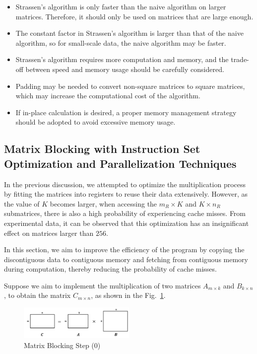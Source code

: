\documentclass[conference]{IEEEtran}
\begin{document}
	\begin{itemize}
\item Strassen's algorithm is only faster than the naive algorithm on larger matrices. Therefore, it should only be used on matrices that are large enough.

\item The constant factor in Strassen's algorithm is larger than that of the naive algorithm, so for small-scale data, the naive algorithm may be faster.

\item Strassen's algorithm requires more computation and memory, and the trade-off between speed and memory usage should be carefully considered.

\item Padding may be needed to convert non-square matrices to square matrices, which may increase the computational cost of the algorithm.

\item If in-place calculation is desired, a proper memory management strategy should be adopted to avoid excessive memory usage.
	 \end{itemize}
	 
	 \subsection{Matrix Blocking with Instruction Set Optimization and Parallelization Techniques}
	 
	 In the previous discussion, we attempted to optimize the multiplication process by fitting the matrices into registers to reuse their data extensively. However, as the value of $K$ becomes larger, when accessing the $m_R \times K$ and $K \times n_R$ submatrices, there is also a high probability of experiencing cache misses. From experimental data, it can be observed that this optimization has an insignificant effect on matrices larger than $256$.
	 
	 In this section, we aim to improve the efficiency of the program by copying the discontiguous data to contiguous memory and fetching from contiguous memory during computation, thereby reducing the probability of cache misses.
	 
	 Suppose we aim to implement the multiplication of two matrices $A_{m \times k}$ and $B_{k \times n}$, to obtain the matrix $C_{m\times n}$, as shown in the Fig.~\ref{matrixBlockingStep0}.
	 
	 \begin{figure}[htbp]
	 	\centerline{\includegraphics[width=0.5\textwidth]{fig2.png}}
	 	\caption{Matrix Blocking Step (0)}
	 	\label{matrixBlockingStep0}
	 \end{figure}
 
\end{document}
